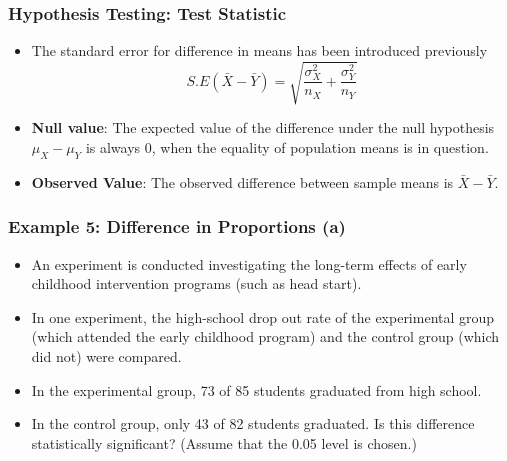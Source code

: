 \documentclass[a4]{beamer}
\begin{document}
\begin{frame}
\frametitle{Hypothesis Testing: Test Statistic}

\begin{itemize}
\item The standard error for difference in means has been introduced previously
\[ S.E(\bar{X} - \bar{Y}) = \sqrt{\frac{\sigma^2_X}{n_X} + \frac{\sigma^2_Y}{n_Y}} \]
\item \textbf{Null value}: The expected value of the difference under the null hypothesis $\mu_X - \mu_Y$ is always 0, when the equality of population means is in question.
\item \textbf{Observed Value}: The observed difference between sample means is $\bar{X} - \bar{Y}$.
\end{itemize}



\end{frame}



\begin{frame}
\frametitle{Example 5: Difference in Proportions (a)}
\begin{itemize}
\item An experiment is conducted investigating the long-term effects of early childhood intervention programs (such as head start).
\item In one experiment, the high-school drop out rate of the experimental group (which attended the early childhood program)
 and the control group (which did not) were compared.
\item In the experimental group, 73 of 85 students graduated from high school. \item In the control group, only 43 of 82 students graduated.
Is this difference statistically significant? (Assume that the 0.05 level is chosen.) \end{itemize}
\end{frame}
\end{document}
